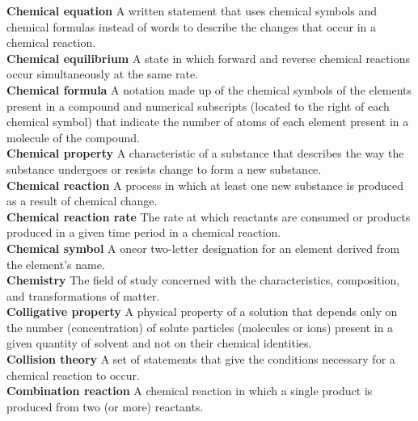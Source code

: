 \documentclass[10pt, roman]{article}
\begin{document}
\noindent \begin{minipage}[c]{0.30\textwidth}
\textbf{Chemical equation} A written statement that uses chemical symbols and chemical formulas instead of words to describe the changes that occur in a chemical reaction. \\
\textbf{Chemical equilibrium} A state in which forward and reverse chemical reactions occur simultaneously at the same rate. \\
\textbf{Chemical formula} A notation made up of the chemical symbols of the elements present in a compound and numerical subscripts (located to the right of each chemical symbol) that indicate the number of atoms of each element present in a molecule of the compound. \\
\textbf{Chemical property} A characteristic of a substance that describes the way the substance undergoes or resists change to form a new substance. \\
\textbf{Chemical reaction} A process in which at least one new substance is produced as a result of chemical change. \\
\textbf{Chemical reaction rate} The rate at which reactants are consumed or products produced in a given time period in a chemical reaction. \\
\textbf{Chemical symbol} A oneor two-letter designation for an element derived from the element’s name. \\
\textbf{Chemistry} The field of study concerned with the characteristics, composition, and transformations of matter. \\
\textbf{Colligative property} A physical property of a solution that depends only on the number (concentration) of solute particles (molecules or ions) present in a given quantity of solvent and not on their chemical identities. \\
\textbf{Collision theory} A set of statements that give the conditions necessary for a chemical reaction to occur. \\
\textbf{Combination reaction} A chemical reaction in which a single product is produced from two (or more) reactants. \\
\end{minipage}%
\hfill
\end{document}
